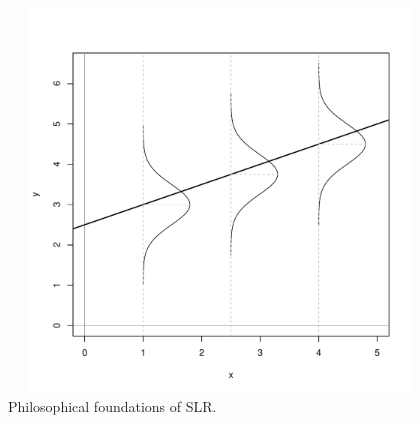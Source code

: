 \documentclass[captions=tableheading]{scrbook}
\begin{document}
\begin{figure}[ht!]
  \includegraphics[width=5in, height=4in]{img/philosophy.pdf}
  \caption[Philosophical foundations of SLR]{\small Philosophical foundations of SLR.}
  \label{fig:philosophy}
\end{figure}
 
\end{document}
